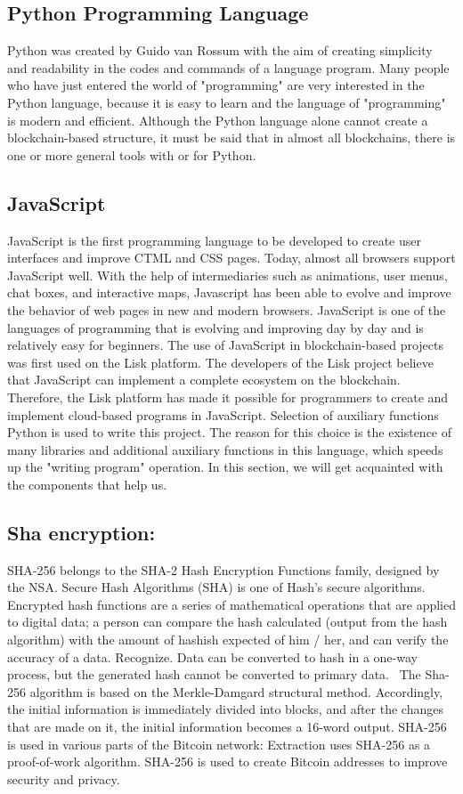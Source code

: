\begin{flushleft}
\subsection{Python Programming Language
}
Python was created by Guido van Rossum with the aim of creating simplicity and readability in the codes and commands of a language program. Many people who have just entered the world of "programming" are very interested in the Python language, because it is easy to learn and the language of "programming" is modern and efficient.
Although the Python language alone cannot create a blockchain-based structure, it must be said that in almost all blockchains, there is one or more general tools with or for Python.
\subsection{JavaScript 
}
JavaScript is the first programming language to be developed to create user interfaces and improve CTML and CSS pages. Today, almost all browsers support JavaScript well.
With the help of intermediaries such as animations, user menus, chat boxes, and interactive maps, Javascript has been able to evolve and improve the behavior of web pages in new and modern browsers. JavaScript is one of the languages of programming that is evolving and improving day by day and is relatively easy for beginners.
The use of JavaScript in blockchain-based projects was first used on the Lisk platform.
The developers of the Lisk project believe that JavaScript can implement a complete ecosystem on the blockchain. Therefore, the Lisk platform has made it possible for programmers to create and implement cloud-based programs in JavaScript.
Selection of auxiliary functions
Python is used to write this project. The reason for this choice is the existence of many libraries and additional auxiliary functions in this language, which speeds up the "writing program" operation. In this section, we will get acquainted with the components that help us.
\subsection{Sha encryption:
}
SHA-256 belongs to the SHA-2 Hash Encryption Functions family, designed by the NSA. Secure Hash Algorithms (SHA) is one of Hash's secure algorithms. Encrypted hash functions are a series of mathematical operations that are applied to digital data; a person can compare the hash calculated (output from the hash algorithm) with the amount of hashish expected of him / her, and can verify the accuracy of a data. Recognize. Data can be converted to hash in a one-way process, but the generated hash cannot be converted to primary data.
 The Sha-256 algorithm is based on the Merkle-Damgard structural method. Accordingly, the initial information is immediately divided into blocks, and after the changes that are made on it, the initial information becomes a 16-word output.
SHA-256 is used in various parts of the Bitcoin network: Extraction uses SHA-256 as a proof-of-work algorithm. SHA-256 is used to create Bitcoin addresses to improve security and privacy.


\end{flushleft}

